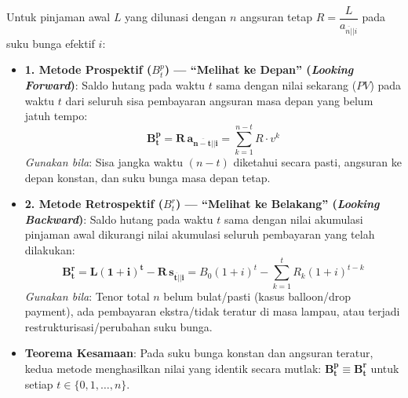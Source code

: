 \documentclass[10pt,a4paper]{article}
\newcommand{\angl}[1]{\overline{#1|}}
\begin{document}
\begin{teoremabox}
Untuk pinjaman awal $L$ yang dilunasi dengan $n$ angsuran tetap $R = \dfrac{L}{a_{\angl{n}|i}}$ pada suku bunga efektif $i$:
\begin{itemize}[leftmargin=1.5em, topsep=1.5pt, itemsep=2pt]
    \item \textbf{1. Metode Prospektif ($B_t^p$) --- ``Melihat ke Depan'' (\textit{Looking Forward})}:
    Saldo hutang pada waktu $t$ sama dengan nilai sekarang ($PV$) pada waktu $t$ dari seluruh sisa pembayaran angsuran masa depan yang belum jatuh tempo:
    \begin{equation*}
        \mathbf{B_t^p = R \, a_{\angl{n-t}|i}} = \sum_{k=1}^{n-t} R \cdot v^k
    \end{equation*}
    \textit{Gunakan bila}: Sisa jangka waktu $(n-t)$ diketahui secara pasti, angsuran ke depan konstan, dan suku bunga masa depan tetap.
    \item \textbf{2. Metode Retrospektif ($B_t^r$) --- ``Melihat ke Belakang'' (\textit{Looking Backward})}:
    Saldo hutang pada waktu $t$ sama dengan nilai akumulasi pinjaman awal dikurangi nilai akumulasi seluruh pembayaran yang telah dilakukan:
    \begin{equation*}
        \mathbf{B_t^r = L(1+i)^t - R \, s_{\angl{t}|i}} = B_0(1+i)^t - \sum_{k=1}^t R_k (1+i)^{t-k}
    \end{equation*}
    \textit{Gunakan bila}: Tenor total $n$ belum bulat/pasti (kasus balloon/drop payment), ada pembayaran ekstra/tidak teratur di masa lampau, atau terjadi restrukturisasi/perubahan suku bunga.
    \item \textbf{Teorema Kesamaan}: Pada suku bunga konstan dan angsuran teratur, kedua metode menghasilkan nilai yang identik secara mutlak: $\mathbf{B_t^p \equiv B_t^r}$ untuk setiap $t \in \{0, 1, \dots, n\}$.
\end{itemize}
\end{teoremabox}
\end{document}
